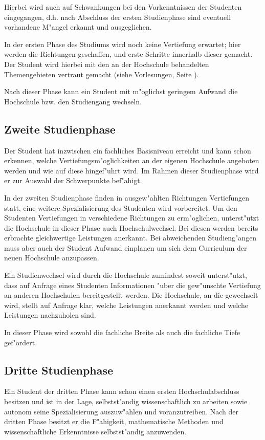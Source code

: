 Hierbei wird auch auf Schwankungen bei den Vorkenntnissen der Studenten
eingegangen, d.h. nach Abschluss der ersten Studienphase sind eventuell 
vorhandene M"angel erkannt und ausgeglichen.

In der ersten Phase des Studiums wird noch keine Vertiefung erwartet; hier werden
die Richtungen geschaffen, und erste Schritte innerhalb dieser gemacht.
Der Student wird hierbei mit den an der Hochschule behandelten Themengebieten
vertraut gemacht (siehe Vorlesungen, Seite \pageref{vorlesung:anforderungen}).

Nach dieser Phase kann ein Student mit m"oglichst geringem Aufwand die Hochschule
bzw. den Studiengang wechseln.


\subsection{Zweite Studienphase}

Der Student hat inzwischen ein fachliches Basisniveau erreicht und
kann schon erkennen, welche Vertiefungsm"oglichkeiten an der eigenen Hochschule angeboten
werden und wie auf diese hingef"uhrt wird.
Im Rahmen dieser Studienphase wird er zur Auswahl der Schwerpunkte bef"ahigt. 

In der zweiten Studienphase finden in ausgew"ahlten Richtungen Vertiefungen statt,
eine weitere Spezialisierung des Studenten wird vorbereitet. Um den Studenten Vertiefungen in verschiedene Richtungen zu erm"oglichen, unterst"utzt die Hochschule
in dieser Phase auch Hochschulwechsel.
Bei diesen werden bereits erbrachte gleichwertige Leistungen anerkannt.
Bei abweichenden Studieng"angen muss
aber auch der Student Aufwand einplanen um sich dem Curriculum der neuen
Hochschule anzupassen.

Ein Studienwechsel wird durch die Hochschule zumindest soweit unterst"utzt, dass auf Anfrage eines Studenten Informationen "uber die gew"unschte Vertiefung an anderen Hochschulen bereitgestellt werden. Die Hochschule, an die gewechselt wird, stellt auf Anfrage klar, welche Leistungen anerkannt werden und welche Leistungen nachzuholen sind.

In dieser Phase wird sowohl die fachliche Breite als auch die fachliche Tiefe gef"ordert.

\subsection{Dritte Studienphase}

Ein Student der dritten Phase kann schon einen ersten Hochschulabschluss besitzen
und ist in der Lage, selbstst"andig wissenschaftlich zu arbeiten sowie autonom seine Spezialisierung
auszuw"ahlen und voranzutreiben. Nach der dritten Phase besitzt er die F"ahigkeit,
mathematische Methoden und wissenschaftliche Erkenntnisse selbstst"andig anzuwenden.

